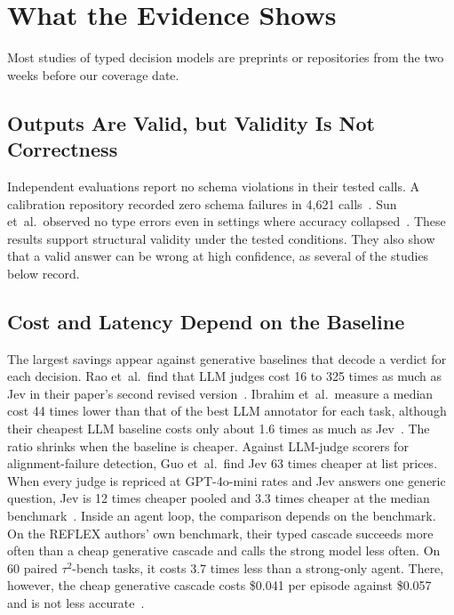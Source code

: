 \section{What the Evidence Shows}
\label{sec:evidence}

Most studies of typed decision models are preprints or repositories from the two weeks before our coverage date.

\subsection{Outputs Are Valid, but Validity Is Not Correctness}

Independent evaluations report no schema violations in their tested calls. A calibration repository recorded zero schema failures in 4{,}621 calls~\cite{scienthoon2026calibration}. Sun et~al.\ observed no type errors even in settings where accuracy collapsed~\cite{sun2026type}. These results support structural validity under the tested conditions. They also show that a valid answer can be wrong at high confidence, as several of the studies below record.

\subsection{Cost and Latency Depend on the Baseline}

The largest savings appear against generative baselines that decode a verdict for each decision. Rao et~al.\ find that LLM judges cost 16 to 325 times as much as Jev in their paper's second revised version~\cite{rao2026jev}. Ibrahim et~al.\ measure a median cost 44 times lower than that of the best LLM annotator for each task, although their cheapest LLM baseline costs only about 1.6 times as much as Jev~\cite{ibrahim2026evaluating}. The ratio shrinks when the baseline is cheaper. Against LLM-judge scorers for alignment-failure detection, Guo et~al.\ find Jev 63 times cheaper at list prices. When every judge is repriced at GPT-4o-mini rates and Jev answers one generic question, Jev is 12 times cheaper pooled and 3.3 times cheaper at the median benchmark~\cite{guo2026just}. Inside an agent loop, the comparison depends on the benchmark. On the REFLEX authors' own benchmark, their typed cascade succeeds more often than a cheap generative cascade and calls the strong model less often. On 60 paired $\tau^2$-bench tasks, it costs 3.7 times less than a strong-only agent. There, however, the cheap generative cascade costs \$0.041 per episode against \$0.057 and is not less accurate~\cite{wu2026reflex}. 

